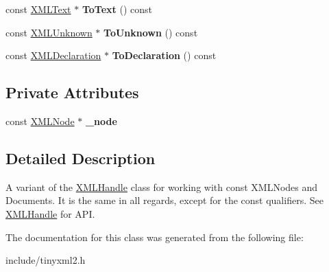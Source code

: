 \begin{DoxyCompactItemize}
\item 
\hypertarget{classtinyxml2_1_1_x_m_l_const_handle_ad86ca7dbb20d0495ae357fe7a866e0be}{}const \hyperlink{classtinyxml2_1_1_x_m_l_text}{X\+M\+L\+Text} $\ast$ {\bfseries To\+Text} () const \label{classtinyxml2_1_1_x_m_l_const_handle_ad86ca7dbb20d0495ae357fe7a866e0be}

\item 
\hypertarget{classtinyxml2_1_1_x_m_l_const_handle_acb358a329e54fa204ed2d0b181566828}{}const \hyperlink{classtinyxml2_1_1_x_m_l_unknown}{X\+M\+L\+Unknown} $\ast$ {\bfseries To\+Unknown} () const \label{classtinyxml2_1_1_x_m_l_const_handle_acb358a329e54fa204ed2d0b181566828}

\item 
\hypertarget{classtinyxml2_1_1_x_m_l_const_handle_a5de0c175845bc30a6f9b3d88d8877eaf}{}const \hyperlink{classtinyxml2_1_1_x_m_l_declaration}{X\+M\+L\+Declaration} $\ast$ {\bfseries To\+Declaration} () const \label{classtinyxml2_1_1_x_m_l_const_handle_a5de0c175845bc30a6f9b3d88d8877eaf}

\end{DoxyCompactItemize}
\subsection*{Private Attributes}
\begin{DoxyCompactItemize}
\item 
\hypertarget{classtinyxml2_1_1_x_m_l_const_handle_ad4d8db839660ef730adfa2439945c4da}{}const \hyperlink{classtinyxml2_1_1_x_m_l_node}{X\+M\+L\+Node} $\ast$ {\bfseries \+\_\+node}\label{classtinyxml2_1_1_x_m_l_const_handle_ad4d8db839660ef730adfa2439945c4da}

\end{DoxyCompactItemize}


\subsection{Detailed Description}
A variant of the \hyperlink{classtinyxml2_1_1_x_m_l_handle}{X\+M\+L\+Handle} class for working with const X\+M\+L\+Nodes and Documents. It is the same in all regards, except for the \textquotesingle{}const\textquotesingle{} qualifiers. See \hyperlink{classtinyxml2_1_1_x_m_l_handle}{X\+M\+L\+Handle} for A\+P\+I. 

The documentation for this class was generated from the following file\+:\begin{DoxyCompactItemize}
\item 
include/tinyxml2.\+h\end{DoxyCompactItemize}
